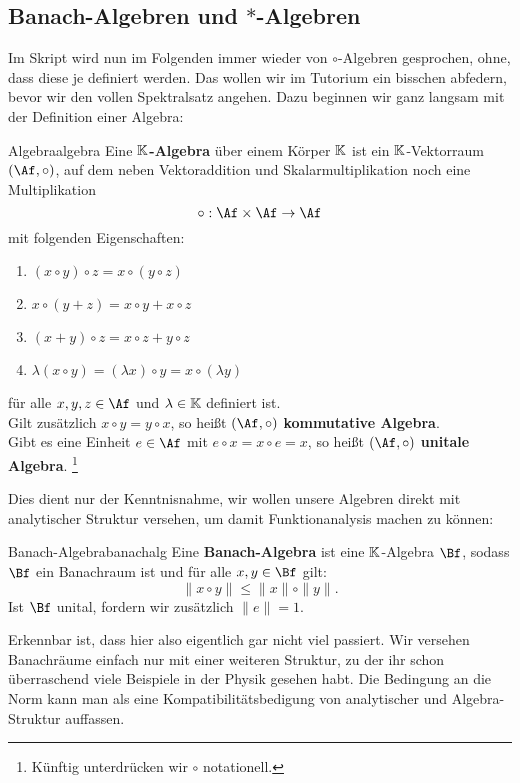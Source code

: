 \subsection{Banach-Algebren und $\ast$-Algebren}
Im Skript wird nun im Folgenden immer wieder von $\circ$-Algebren gesprochen, ohne, dass diese je definiert werden. Das wollen wir im Tutorium ein bisschen abfedern, bevor wir den vollen Spektralsatz angehen. Dazu beginnen wir ganz langsam mit der Definition einer Algebra:
\begin{definition}{Algebra}{algebra}
Eine $\mathbb{K}$\textbf{-Algebra} über einem Körper $\mathbb{K}$ ist ein $\mathbb{K}$-Vektorraum $(\Af, \circ)$, auf dem neben Vektoraddition und Skalarmultiplikation noch eine Multiplikation
\begin{equation}
\circ: \Af \times \Af \to \Af
\end{equation}
mit folgenden Eigenschaften:
\begin{enumerate}[({A}1)]
\item $(x \circ y) \circ z = x \circ (y \circ z)$
\item $x \circ (y+z) = x \circ y + x \circ z$
\item $(x+y) \circ z = x \circ z + y \circ z$
\item $\lambda (x \circ y) = (\lambda x) \circ y = x \circ (\lambda y)$
\end{enumerate}
für alle $x,y,z \in \Af$ und $\lambda \in \mathbb{K}$ definiert ist. \\
Gilt zusätzlich $x \circ y = y \circ x$, so heißt $(\Af, \circ)$ \textbf{kommutative Algebra}.\\
Gibt es eine Einheit $e \in \Af$ mit $e \circ x = x \circ e = x$, so heißt $(\Af, \circ)$ \textbf{unitale Algebra}.
\footnote{Künftig unterdrücken wir $\circ$ notationell.}
\end{definition}
Dies dient nur der Kenntnisnahme, wir wollen unsere Algebren direkt mit analytischer Struktur versehen, um damit Funktionanalysis machen zu können:
\begin{definition}{Banach-Algebra}{banachalg}
Eine \textbf{Banach-Algebra} ist eine $\mathbb{K}$-Algebra $\Bf$, sodass $\Bf$ ein Banachraum ist und für alle $x,y \in \Bf$ gilt:
\[ \| x \circ y \| \leq \|x\| \circ \|y\|. \] Ist $\Bf$ unital, fordern wir zusätzlich $\|e\|=1$.
\end{definition}
Erkennbar ist, dass hier also eigentlich gar nicht viel passiert. Wir versehen Banachräume einfach nur mit einer weiteren Struktur, zu der ihr schon überraschend viele Beispiele in der Physik gesehen habt. Die Bedingung an die Norm kann man als eine Kompatibilitätsbedigung von analytischer und Algebra-Struktur auffassen.
